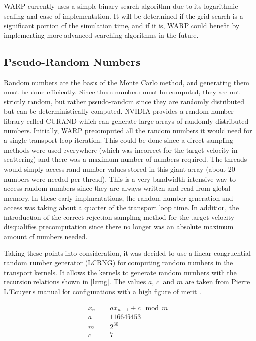 WARP currently uses a simple binary search algorithm due to its logarithmic scaling and ease of implementation.  It will be determined if the grid search is a significant portion of the simulation time, and if it is, WARP could benefit by implementing more advanced searching algorithms in the future.

\subsection{Pseudo-Random Numbers}

Random numbers are the basis of the Monte Carlo method, and generating them must be done efficiently.  Since these numbers must be computed, they are not strictly random, but rather pseudo-random since they are randomly distributed but can be deterministically computed.  NVIDIA provides a random number library called CURAND which can generate large arrays of randomly distributed numbers.  Initially, WARP precomputed all the random numbers it would need for a single transport loop iteration.  This could be done since a direct sampling methods were used everywhere (which was incorrect for the target velocity in scattering) and there was a maximum number of numbers required.  The threads would simply access rand number values stored in this giant array (about 20 numbers were needed per thread).  This is a very bandwidth-intensive way to access random numbers since they are always written and read from global memory.  In these early implmentations, the random number generation and access was taking about a quarter of the transport loop time.  In addition, the introduction of the correct rejection sampling method for the target velocity disqualifies precomputation since there no longer was an absolute maximum amount of numbers needed.

Taking these points into consideration, it was decided to use a linear congruential random number generator (LCRNG) for computing random numbers in the transport kernels.  It allows the kernels to generate random numbers with the recursion relations shown in \eqref{lcrng}.  The values $a$, $c$, and $m$ are taken from Pierre L'Ecuyer's manual for configurations with a high figure of merit \cite{lcrng}.   

\begin{equation}
\begin{split}
x_{n} &= a x_{n-1} + c \mod m  \\
a &= 116646453 \\
m &=  2^{30} \\
c &= 7
\end{split}
\label{lcrng}
\end{equation}

